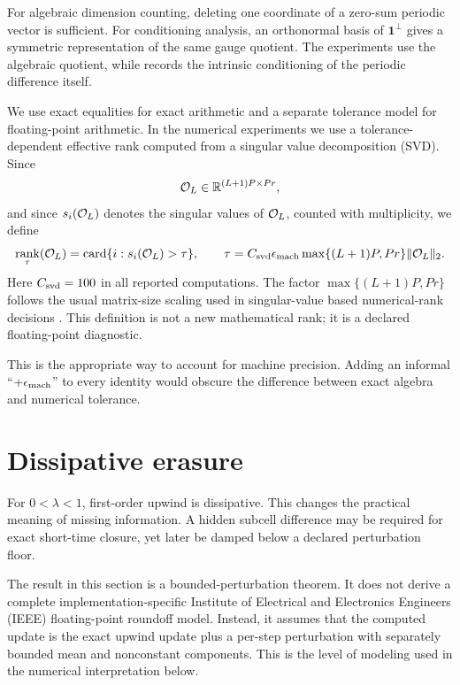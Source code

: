 \documentclass[preprint,12pt]{elsarticle}
\theoremstyle{plain}
\theoremstyle{remark}
\theoremstyle{definition}
\newcommand{\epsmach}{\epsilon_{\rm mach}}
\DeclareMathOperator{\rank}{rank}
\DeclareMathOperator{\card}{card}
\begin{document}
For algebraic dimension counting, deleting one coordinate of a zero-sum
periodic vector is sufficient.  For conditioning analysis, an orthonormal
basis of \(\mathbf 1^\perp\) gives a symmetric representation of the same
gauge quotient.  The experiments use the algebraic quotient, while
 records the intrinsic conditioning of the
periodic difference itself.

We use exact equalities for exact arithmetic and a separate tolerance model
for floating-point arithmetic.  In the numerical experiments we use a tolerance-dependent effective rank computed from a singular value decomposition (SVD).  Since
\[
  {\cal O}_L\in\mathbb R^{(L+1)P\times Pr},
\]
and since \(s_i({\cal O}_L)\) denotes the singular values of
\({\cal O}_L\), counted with multiplicity, we define
\[
  \rank_\tau({\cal O}_L)
  =
  \card\{i:s_i({\cal O}_L)>\tau\},
  \qquad
  \tau
  =
  C_{\rm svd}\epsmach
  \max\{(L+1)P,Pr\}
  \|{\cal O}_L\|_2 .
\]
Here \(C_{\rm svd}=100\) in all reported computations.  The factor
\(\max\{(L+1)P,Pr\}\) follows the usual matrix-size scaling used in
singular-value based numerical-rank decisions
\cite{TrefethenBau:1997nla,Higham:2002accuracy}.  This definition is not a
new mathematical rank; it is a declared floating-point diagnostic.

This is the appropriate way to account for machine precision.  Adding an
informal ``\(+\epsmach\)'' to every identity would obscure the difference
between exact algebra and numerical tolerance.

\section{Dissipative erasure} \label{sec:diss_eras}

For \(0<\lambda<1\), first-order upwind is dissipative.  This changes the
practical meaning of missing information.  A hidden subcell difference may
be required for exact short-time closure, yet later be damped below a
declared perturbation floor.

The result in this section is a bounded-perturbation theorem.  It does not
derive a complete implementation-specific Institute of Electrical and
Electronics Engineers (IEEE) floating-point roundoff model.  Instead, it
assumes that the computed update is the exact upwind update plus a
per-step perturbation with separately bounded mean and nonconstant
components.  This is the level of modeling used in the numerical
interpretation below.
\end{document}

